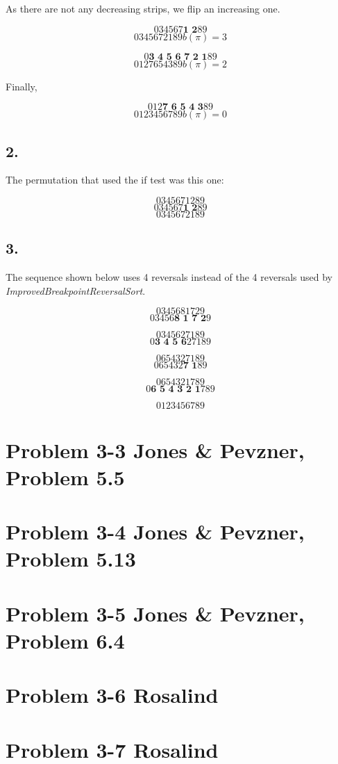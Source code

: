 \documentclass{article}
\begin{document}
As there are not any decreasing strips, we flip an increasing one.

$$0 3 4 5 6 7 \textbf{1 2} 8 9$$
$$0 3 4 5 6 7 2 1 8 9 b(\pi) = 3$$

$$0 \textbf{3 4 5 6 7 2 1} 8 9$$
$$0 1 2 7 6 5 4 3 8 9 b(\pi) = 2$$

Finally,

$$0 1 2 \textbf{7 6 5 4 3} 8 9$$
$$0 1 2 3 4 5 6 7 8 9 b(\pi) = 0$$

\subsection*{2.}

The permutation that used the if test was this one:

$$0 3 4 5 6 7 1 2 8 9$$
$$0 3 4 5 6 7 \textbf{1 2} 8 9$$
$$0 3 4 5 6 7 2 1 8 9$$

\subsection*{3.}

The sequence shown below uses 4 reversals instead of the 4 reversals used by \textit{ImprovedBreakpointReversalSort}.

$$0 3 4 5 6 8 1 7 2 9$$
$$0 3 4 5 6 \textbf{8 1 7 2} 9$$

$$0 3 4 5 6 2 7 1 8 9$$
$$0 \textbf{3 4 5 6} 2 7 1 8 9$$

$$0 6 5 4 3 2 7 1 8 9$$
$$0 6 5 4 3 2 \textbf{7 1} 8 9$$

$$0 6 5 4 3 2 1 7 8 9$$
$$0 \textbf{6 5 4 3 2 1} 7 8 9$$

$$0 1 2 3 4 5 6 7 8 9$$

\section*{Problem 3-3 Jones \& Pevzner, Problem 5.5}

\section*{Problem 3-4 Jones \& Pevzner, Problem 5.13}

\section*{Problem 3-5 Jones \& Pevzner, Problem 6.4}

\section*{Problem 3-6 Rosalind}

\section*{Problem 3-7 Rosalind}
\end{document}
